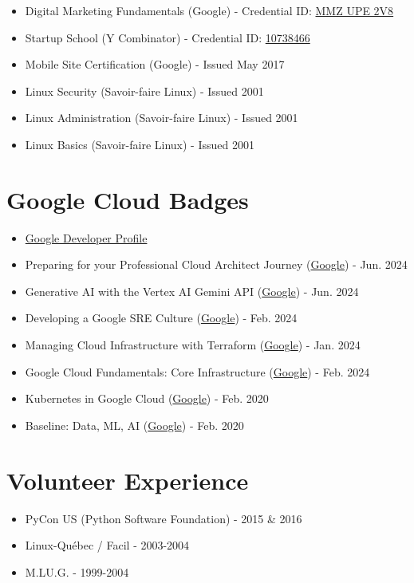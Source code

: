 \documentclass[11pt,a4paper]{article}
\begin{document}
\begin{itemize}
\item Digital Marketing Fundamentals (Google) - Credential ID: \href{https://learndigital.withgoogle.com/digitalgarage/validate-certificate-code}{MMZ UPE 2V8}
\item Startup School (Y Combinator) - Credential ID: \href{https://www.credential.net/hviasngk\#acc.zbGLx98q}{10738466}
\item Mobile Site Certification (Google) - Issued May 2017
\item Linux Security (Savoir-faire Linux) - Issued 2001
\item Linux Administration (Savoir-faire Linux) - Issued 2001
\item Linux Basics (Savoir-faire Linux) - Issued 2001
\end{itemize}
\section*{Google Cloud Badges}
\label{sec:orgf46707c}
\begin{itemize}
\item \href{https://www.cloudskillsboost.google/public\_profiles/4683c2e3-1391-42e9-9bc4-3960af2ef1d8}{Google Developer Profile}
\item Preparing for your Professional Cloud Architect Journey (\href{https://www.cloudskillsboost.google/public\_profiles/4683c2e3-1391-42e9-9bc4-3960af2ef1d8/badges/9576010}{Google}) - Jun. 2024
\item Generative AI with the Vertex AI Gemini API (\href{https://www.cloudskillsboost.google/public\_profiles/4683c2e3-1391-42e9-9bc4-3960af2ef1d8/badges/9566471}{Google}) - Jun. 2024
\item Developing a Google SRE Culture (\href{https://www.cloudskillsboost.google/public\_profiles/4683c2e3-1391-42e9-9bc4-3960af2ef1d8/badges/8105696}{Google}) - Feb. 2024
\item Managing Cloud Infrastructure with Terraform (\href{https://www.cloudskillsboost.google/public\_profiles/4683c2e3-1391-42e9-9bc4-3960af2ef1d8/badges/6950095}{Google}) - Jan. 2024
\item Google Cloud Fundamentals: Core Infrastructure (\href{https://www.cloudskillsboost.google/public\_profiles/4683c2e3-1391-42e9-9bc4-3960af2ef1d8/badges/8105696}{Google}) - Feb. 2024
\item Kubernetes in Google Cloud (\href{https://www.cloudskillsboost.google/public\_profiles/4683c2e3-1391-42e9-9bc4-3960af2ef1d8/badges/205644}{Google}) - Feb. 2020
\item Baseline: Data, ML, AI (\href{https://www.cloudskillsboost.google/public\_profiles/4683c2e3-1391-42e9-9bc4-3960af2ef1d8/badges/205617}{Google}) - Feb. 2020
\end{itemize}
\section*{Volunteer Experience}
\label{sec:org8fd883c}
\begin{itemize}
\item PyCon US (Python Software Foundation) - 2015 \& 2016
\item Linux-Québec / Facil - 2003-2004
\item M.LU.G. - 1999-2004
\end{itemize}
\end{document}
